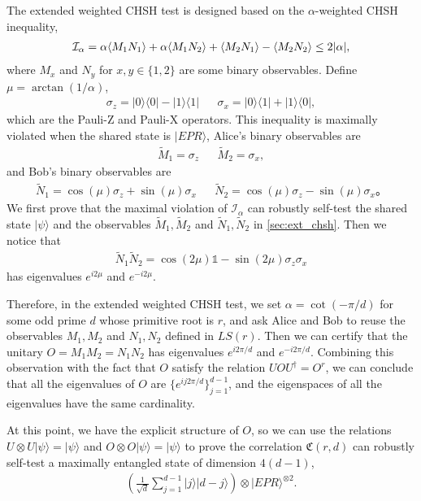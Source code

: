 \documentclass[11pt,letterpaper]{article}
\newcommand{\ket}[1]{|#1\rangle}
\newcommand{\ketbra}[2]{|#1\rangle\langle#2|}
\newcommand{\x}{\otimes}
\newcommand{\ct}{^{\dagger}}
\DeclarePairedDelimiter{\ip}{\langle}{\rangle}
\newcommand{\1}{\mathbb{1}}
\newcommand{\LS}{LS}
\newcommand{\paulix}{\sigma_x}
\newcommand{\pauliz}{\sigma_z}
\newcommand{\tM}{\tilde{M}}
\newcommand{\tN}{\tilde{N}}
\newcommand{\fC}{\mathfrak{C}}
\newcommand{\I}{\mathcal{I}}
\theoremstyle{definition}
\begin{document}
The extended weighted CHSH test is designed based on the $\alpha$-weighted CHSH inequality, 
\begin{align*}
    \I_\alpha = \alpha\ip{M_1N_1}+\alpha\ip{M_1N_2} + \ip{M_2N_1} - \ip{M_2N_2}\leq 2|\alpha|,
\end{align*}
where $M_x$ and $N_y$ for $x,y \in \{1, 2\}$ are some binary observables.
Define $\mu = \arctan(1/\alpha)$,
\begin{align*}
    \pauliz = \ketbra{0}{0} - \ketbra{1}{1} && \paulix = \ketbra{0}{1} + \ketbra{1}{0},
\end{align*}
which are the Pauli-Z and Pauli-X operators.
This inequality is maximally violated when the shared state is $\ket{EPR}$,
Alice's binary observables are
\begin{align*}
    \tM_1 = \pauliz && \tM_2 = \paulix,
\end{align*}
and Bob's binary observables are
\begin{align*}
    \tN_1 = \cos(\mu) \pauliz+ \sin(\mu) \paulix  && \tN_2 = \cos(\mu) \pauliz - \sin(\mu) \paulix。
\end{align*}
We first prove that the maximal violation of $\I_\alpha$ can robustly self-test the shared
state $\ket{\psi}$ and the observables $\tM_1, \tM_2$ and $\tN_1, \tN_2$ in \cref{sec:ext_chsh}.
Then we notice that 
\begin{align*}
    \tN_1\tN_2 = \cos(2\mu) \1  - \sin(2 \mu) \pauliz \paulix 
\end{align*}
has eigenvalues $e^{i 2\mu}$ and $e^{-i 2\mu}$.

Therefore, in the extended weighted CHSH test, we set $\alpha = \cot( -\pi/d )$
for some odd prime $d$ whose primitive root is $r$,
and ask Alice and Bob
to reuse the observables $M_1, M_2$ and $N_1, N_2$ defined in $\LS(r)$. Then we can certify that
the unitary $O = M_1M_2 = N_1N_2$ has eigenvalues $e^{i2\pi/d}$ and $e^{-i2\pi/d}$.
Combining this observation with the fact that $O$ satisfy the relation $UOU\ct = O^r$,
we can conclude that all the eigenvalues of $O$ are $\{ e^{ij 2\pi /d} \}_{j=1}^{d-1}$,
and the eigenspaces of all the eigenvalues have the same cardinality.

At this point, we have the explicit structure of $O$, so we 
can use the relations $U \x U \ket{\psi} = \ket{\psi}$ and $ O \x O \ket{\psi} = \ket{\psi}$
to prove the correlation $\fC(r, d)$ can robustly self-test 
a maximally entangled state of dimension $4(d-1)$,
\begin{align*}
    \left(\frac{1}{\sqrt{d}} \sum_{j=1}^{d-1}\ket{j}\ket{d-j}\right)\x 
    \ket{EPR}^{\x 2}.
\end{align*}
\end{document}
